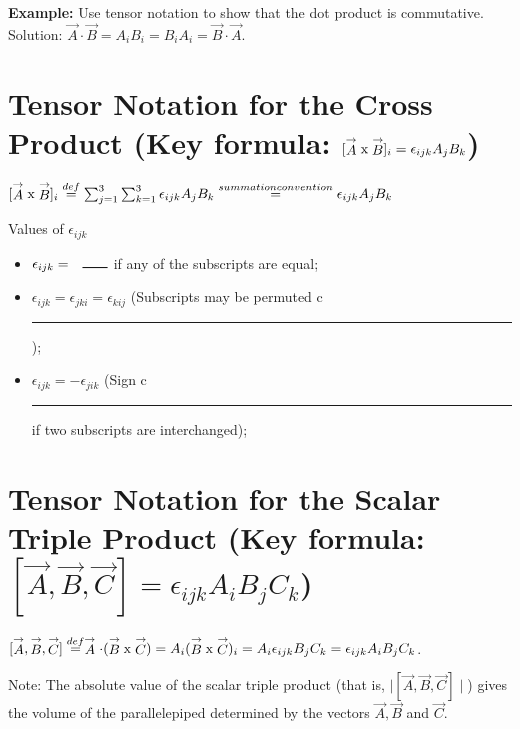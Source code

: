 {\bf \flushleft Example:} Use tensor notation to show that the dot product is commutative.
{\flushleft Solution:}  $\stackrel{\rightarrow}{A} \cdot \stackrel{\rightarrow}{B} = A_iB_i = B_iA_i = \stackrel{\rightarrow}{B} \cdot \stackrel{\rightarrow}{A} $.


\section{ Tensor Notation for the Cross Product (Key formula: $[\stackrel{\rightarrow}{A} \textup{x} \stackrel{\rightarrow}{B}]_i = \epsilon_{ijk}A_jB_k $) }

\vspace{.1in}
 $[\stackrel{\rightarrow}{A} \textup{x} \stackrel{\rightarrow}{B}]_i \stackrel{def}{=} \sum_{j=1}^3\sum_{k=1}^3\epsilon_{ijk}A_jB_k \stackrel{summation convention}{=} \epsilon_{ijk}A_jB_k$

 {\flushleft Values of $\epsilon_{ijk}$}
  \begin{itemize}
 \item $\epsilon_{ijk}= \hspace{.1in}\rule{.25in}{.01in}$ if any of the subscripts are equal;
 \item $\epsilon_{ijk}= \epsilon_{jki}=\epsilon_{kij}$  (Subscripts may be permuted c\hspace{.1in}\rule{.5in}{.01in});
 \item  $\epsilon_{ijk}= -\epsilon_{jik}$ (Sign  c\hspace{.1in}\rule{.5in}{.01in} if two subscripts are interchanged);
 \end{itemize}
\vspace{.2in}

\section{Tensor Notation for the Scalar Triple Product (Key formula: $[\stackrel{\rightarrow}{A} , \stackrel{\rightarrow}{B} , \stackrel{\rightarrow}{C}]  =   \epsilon_{ijk}A_iB_jC_k$) }
\vspace{.1in}

$[\stackrel{\rightarrow}{A} , \stackrel{\rightarrow}{B} , \stackrel{\rightarrow}{C}]  \stackrel{def}{=}
\stackrel{\rightarrow}{A} \cdot (\stackrel{\rightarrow}{B} \textup{x} \stackrel{\rightarrow}{C})=
A_i (\stackrel{\rightarrow}{B} \textup{x} \stackrel{\rightarrow}{C})_i =
A_i \epsilon_{ijk}B_jC_k = \epsilon_{ijk}A_iB_jC_k$.

{\flushleft Note:} The absolute value of the scalar triple product (that is, $\mid  [\stackrel{\rightarrow}{A} , \stackrel{\rightarrow}{B} , \stackrel{\rightarrow}{C}]  \mid $) gives the volume of the parallelepiped determined by the vectors $\stackrel{\rightarrow}{A} , \stackrel{\rightarrow}{B}$ and  $\stackrel{\rightarrow}{C}$.


